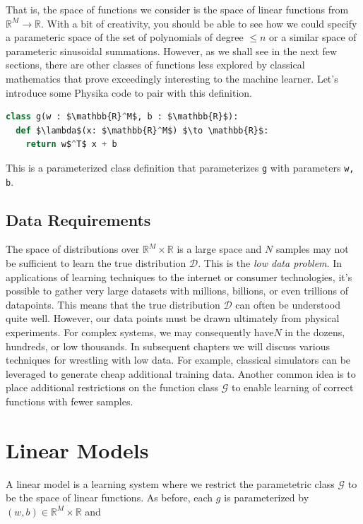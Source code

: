 \documentclass[book.tex]{subfiles}
\begin{document}
That is, the space of functions we consider is the space of linear functions from $\mathbb{R}^M\to \mathbb{R}$. With a bit of creativity, you should be able to see how we could specify a parameteric space of the set of polynomials of degree $\leq n$ or a similar space of parameteric sinusoidal summations. However, as we shall see in the next few sections, there are other classes of functions less explored by classical mathematics that prove exceedingly interesting to the machine learner. Let's introduce some Physika code to pair with this definition.

\begin{lstlisting}[language=python]
class g(w : $\mathbb{R}^M$, b : $\mathbb{R}$):
  def $\lambda$(x: $\mathbb{R}^M$) $\to \mathbb{R}$:
    return w$^T$ x + b
\end{lstlisting}

This is a parameterized class definition that parameterizes \lstinline{g} with parameters \lstinline{w, b}.

\subsection{Data Requirements}

The space of distributions over $\mathbb{R}^M \times \mathbb{R}$ is a large space and $N$ samples may not be sufficient to learn the true distribution $\mathcal{D}$. This is the \textit{low data problem}. In applications of learning techniques to the internet or consumer technologies, it's possible to gather very large datasets with millions, billions, or even trillions of datapoints. This means that the true distribution $\mathcal{D}$ can often be understood quite well. However, our data points must be drawn ultimately from physical experiments. For complex systems, we may consequently have$N$ in the dozens, hundreds, or low thousands. In subsequent chapters we will discuss various techniques for wrestling with low data. For example, classical simulators can be leveraged to generate cheap additional training data. Another common idea is to place additional restrictions on the function class $\mathcal{G}$ to enable learning of correct functions with fewer samples.


\section{Linear Models}

A linear model is a learning system where we restrict the parametetric class $\mathcal{G}$ to be the space of linear functions. As before, each $g$ is parameterized by $(w, b) \in \mathbb{R}^M \times \mathbb{R}$ and
\end{document}
